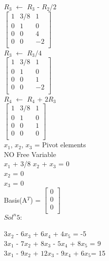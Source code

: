 \documentclass{article}
\begin{document}
  $R_3$ $\leftarrow$ $R_3$ - $R_2/2$ \\
  
  $\begin{bmatrix}
    1 & 3/8 & 1 \\
    0 & 1 & 0 \\
    0 & 0 & 4 \\
    0 & 0 & -2 \\
    \end{bmatrix}$ \\
  
  $R_3$ $\leftarrow$ $R_3/4$ \\
  
  $\begin{bmatrix}
    1 & 3/8 & 1 \\
    0 & 1 & 0 \\
    0 & 0 & 1 \\
    0 & 0 & -2 \\
    \end{bmatrix}$ \\
    
  $R_4$ $\leftarrow$ $R_4$ + $2R_3$ \\
  
  $\begin{bmatrix}
    1 & 3/8 & 1 \\
    0 & 1 & 0 \\
    0 & 0 & 1 \\
    0 & 0 & 0 \\
    \end{bmatrix}$ \\
  
        $x_1$, $x_2$, $x_3$ = Pivot elements \\
    
    NO Free Variable \\
    $x_1$ + 3/8 $x_2$ + $x_3$ = 0 \\
    $x_2$ = 0 \\
    $x_3$ = 0 \\
    
    Basis(A$^T$) = $\begin{bmatrix}
    0 \\
    0 \\
    0 \\
    \end{bmatrix}$ \\
    
$Sol^n 5:$ \\ \\ 
$3x_2$ -  $6x_3$ + $6x_4$ + $4x_5$ = -5 \\
$3x_1$ -  $7x_2$ + $8x_3$ - $5x_4$ + $8x_5$ = 9 \\
$3x_1$ -  $9x_2$ + $12x_3$ - $9x_4$ + $6x_5$= 15 \\
\end{document}
